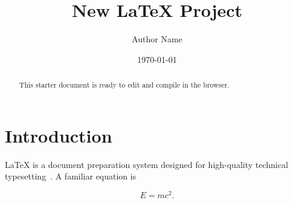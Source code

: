 \documentclass[11pt]{article}
\title{New LaTeX Project}
\author{Author Name}
\date{\today}
\begin{document}
\maketitle

\begin{abstract}
This starter document is ready to edit and compile in the browser.
\end{abstract}

\section{Introduction}

LaTeX is a document preparation system designed for high-quality technical
typesetting~\cite{lamport1994latex}. A familiar equation is

\begin{equation}
  E = mc^2.
\end{equation}



\end{document}
